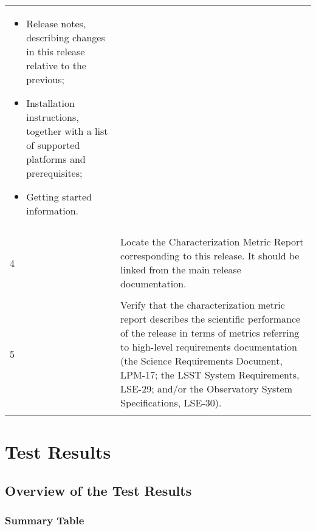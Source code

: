\documentclass[DM,lsstdraft,STR,toc]{lsstdoc}
\providecommand{\tightlist}{
  \setlength{\itemsep}{0pt}\setlength{\parskip}{0pt}}
\begin{document}
\begin{longtable}[]{p{1.3cm}p{15cm}}
\begin{minipage}[t]{13cm}
{\begin{itemize}
\tightlist
\item
  Release notes, describing changes in this release relative to the
  previous;
\item
  Installation instructions, together with a list of supported platforms
  and prerequisites;
\item
  Getting started information.
\end{itemize}

\vspace{\dp0}
} \end{minipage} \\
\\ \midrule
\multirow{1}{*}{ 4 } &
\begin{minipage}[t]{13cm}{\footnotesize
Locate the Characterization Metric Report corresponding to this release.
It should be linked from the main release documentation.

\vspace{\dp0}
} \end{minipage} \\
\\ \midrule
\multirow{1}{*}{ 5 } &
\begin{minipage}[t]{13cm}{\footnotesize
Verify that the characterization metric report describes the scientific
performance of the release in terms of metrics referring to high-level
requirements documentation (the Science Requirements Document, LPM-17;
the LSST System Requirements, LSE-29; and/or the Observatory System
Specifications, LSE-30).

\vspace{\dp0}
} \end{minipage} \\
\\ \midrule
\end{longtable}




\newpage

\section{Test Results}
\label{sect:testresults}

\subsection{Overview of the Test Results}
\label{sect:overview}

\subsubsection{Summary Table}
\label{sect:summarytable}
\end{document}
